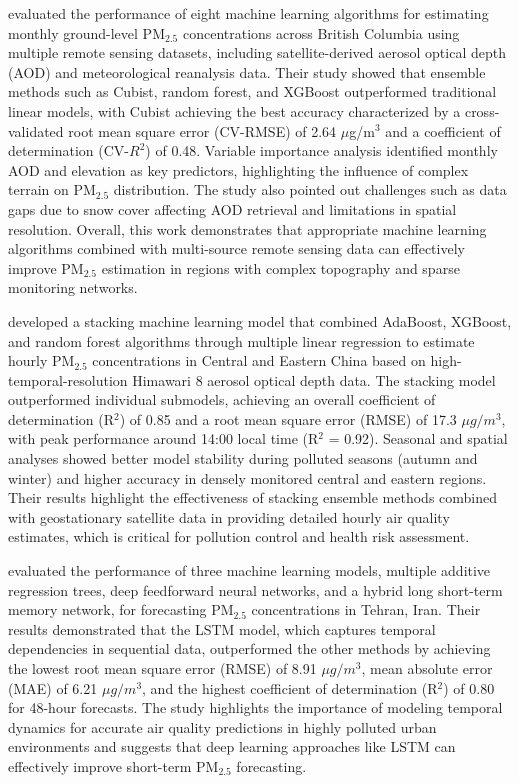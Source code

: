 \documentclass[11pt]{article}
\begin{document}
\citet{xu2018evaluation} evaluated the performance of eight machine learning algorithms for estimating monthly ground-level PM$_{2.5}$ concentrations across British Columbia using multiple remote sensing datasets, including satellite-derived aerosol optical depth (AOD) and meteorological reanalysis data. Their study showed that ensemble methods such as Cubist, random forest, and XGBoost outperformed traditional linear models, with Cubist achieving the best accuracy characterized by a cross-validated root mean square error (CV-RMSE) of 2.64 $\mu$g/m$^3$ and a coefficient of determination (CV-$R^{2}$) of 0.48. Variable importance analysis identified monthly AOD and elevation as key predictors, highlighting the influence of complex terrain on PM$_{2.5}$ distribution. The study also pointed out challenges such as data gaps due to snow cover affecting AOD retrieval and limitations in spatial resolution. Overall, this work demonstrates that appropriate machine learning algorithms combined with multi-source remote sensing data can effectively improve PM$_{2.5}$ estimation in regions with complex topography and sparse monitoring networks.

\citet{chen2019stacking} developed a stacking machine learning model that combined AdaBoost, XGBoost, and random forest algorithms through multiple linear regression to estimate hourly PM$_{2.5}$ concentrations in Central and Eastern China based on high-temporal-resolution Himawari 8 aerosol optical depth data. The stacking model outperformed individual submodels, achieving an overall coefficient of determination (R$^2$) of 0.85 and a root mean square error (RMSE) of 17.3 \(\mu g/m^3\), with peak performance around 14:00 local time (R$^2$ = 0.92). Seasonal and spatial analyses showed better model stability during polluted seasons (autumn and winter) and higher accuracy in densely monitored central and eastern regions. Their results highlight the effectiveness of stacking ensemble methods combined with geostationary satellite data in providing detailed hourly air quality estimates, which is critical for pollution control and health risk assessment.

\citet{karimian2019evaluation} evaluated the performance of three machine learning models, multiple additive regression trees, deep feedforward neural networks, and a hybrid long short-term memory network, for forecasting PM$_{2.5}$ concentrations in Tehran, Iran. Their results demonstrated that the LSTM model, which captures temporal dependencies in sequential data, outperformed the other methods by achieving the lowest root mean square error (RMSE) of 8.91 \(\mu g/m^3\), mean absolute error (MAE) of 6.21 \(\mu g/m^3\), and the highest coefficient of determination (R$^2$) of 0.80 for 48-hour forecasts. The study highlights the importance of modeling temporal dynamics for accurate air quality predictions in highly polluted urban environments and suggests that deep learning approaches like LSTM can effectively improve short-term PM$_{2.5}$ forecasting.
\end{document}
